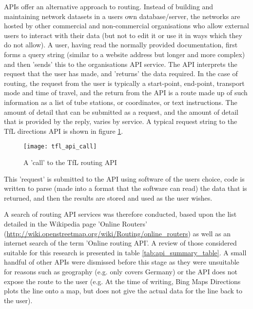APIs offer an alternative approach to routing. Instead of building and maintaining network datasets in a users own database/server, the networks are hosted by other commercial and non-commercial organisations who allow external users to interact with their data (but not to edit it or use it in ways which they do not allow).  A user, having read the normally provided documentation, first forms a query string (similar to a website address but longer and more complex) and then 'sends' this to the organisations API service. The API interprets the request that the user has made, and 'returns' the data required. In the case of routing, the request from the user is typically a start-point, end-point, transport mode and time of travel, and the return from the API is a route made up of such information as a list of tube stations, or coordinates, or text instructions. The amount of detail that can be submitted as a request, and the amount of detail that is provided by the reply, varies by service. A typical request string to the TfL directions API is shown in figure \ref{fig:tfl_api_call}.

\begin{figure}[H]
\centering
\texttt{[image: tfl\_api\_call]}
\caption{A 'call' to the TfL routing API}
\label{fig:tfl_api_call}
\end{figure}

This 'request' is submitted to the API using software of the users choice, code is written to parse (made into a format that the software can read) the data that is returned, and then the results are stored and used as the user wishes.

A search of routing API services was therefore conducted, based upon the list detailed in the Wikipedia page 'Online Routers' (\url{http://wiki.openstreetmap.org/wiki/Routing/online_routers}) as well as an internet search of the term 'Online routing API'. A review of those considered suitable for this research is presented in table \ref{tab:api_summary_table}. A small handful of other APIs were dismissed before this stage as they were unsuitable for reasons such as geography (e.g. only covers Germany) or the API does not expose the route to the user (e.g. At the time of writing, Bing Maps Directions plots the line onto a map, but does not give the actual data for the line back to the user).

